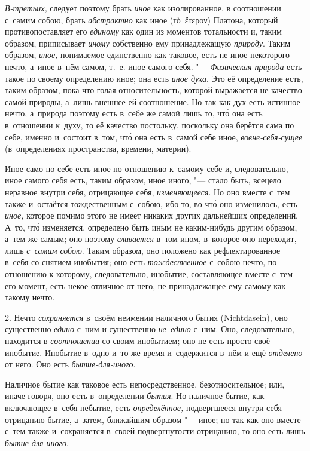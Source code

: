 {\em В-третьих,} следует поэтому брать {\em иное} как изолированное,
в соотношении с~самим собою, брать {\em абстрактно}
как иное (\textgreek{τὸ~ἕτερον}) Платона, который
противопоставляет его {\em единому} как один из
моментов тотальности и, таким образом, приписывает
{\em иному} собственно ему принадлежащую {\em природу}. Таким образом,
{\em иное,} понимаемое единственно как таковое, есть
не иное некоторого нечто, а~иное в~нём самом, т.~е. иное самого себя.
"--- {\em Физическая природа} есть такое по своему
определению иное; она есть {\em иное духа}. Это её
определение есть, таким образом, пока что голая относительность, которой
выражается не качество самой природы, а~лишь внешнее ей соотношение. Но так
как дух есть истинное нечто, а~природа поэтому есть в~себе же самой лишь
то, чт\'{о} она есть в~отношении к~духу, то её качество постольку, поскольку
она берётся сама по себе, именно и~состоит в~том, чт\'{о} она есть в~самой себе
иное, {\em вовне-себя-сущее} (в~определениях пространства, времени, материи).

Иное само по себе есть иное по отношению к~самому себе и, следовательно, иное самого
себя есть, таким образом, иное иного, "--- стало быть, всецело неравное
внутри себя, отрицающее себя, {\em изменяющееся}. Но
оно вместе с~тем также и~остаётся тождественным с~собою, ибо то, во чт\'{о} оно
изменилось, есть {\em иное,} которое помимо этого не
имеет никаких других дальнейших определений. А~то, чт\'{о} изменяется,
определено быть иным не каким-нибудь другим образом, а~тем же самым; оно
поэтому {\em сливается} в~том ином, в~которое оно
переходит, лишь {\em с~самим собою}. Таким образом, оно
положено как рефлектированное в~себя со снятием инобытия; оно есть
{\em тождественное} с~собою нечто, по отношению к
которому, следовательно, инобытие, составляющее вместе с~тем его момент,
есть некое отличное от него, не принадлежащее ему самому как такому нечто.

2. Нечто {\em сохраняется} в~своём неимении наличного
бытия (Nicht\-dasein), оно существенно {\em едино} с~ним
и существенно {\em не~едино} с~ним. Оно, следовательно,
находится в {\em соотношении} со своим инобытием; оно не есть просто
своё инобытие. Инобытие в~одно и~то же время и~содержится в~нём
и ещё {\em отделено} от него. Оно есть {\em бытие-для-иного}.

Наличное бытие как таковое есть непосредственное, безотносительное; или,
иначе говоря, оно есть в~определении {\em бытия}. Но
наличное бытие, как включающее в~себя небытие, есть
{\em определённое,} подвергшееся внутри себя отрицанию
бытие, а~затем, ближайшим образом "--- иное; но так как оно вместе с~тем
также и~сохраняется в~своей подвергнутости отрицанию, то оно есть лишь
{\em бытие-для-иного}.

